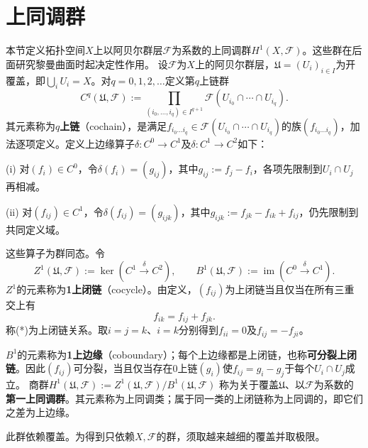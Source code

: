 \section{上同调群}
本节定义拓扑空间$X$上以阿贝尔群层$\mathcal F$为系数的上同调群$H^1(X,\mathcal F)$。这些群在后面研究黎曼曲面时起决定性作用。
设$\mathcal F$为$X$上的阿贝尔群层，$\mathfrak U=(U_i)_{i\in I}$为开覆盖，即$\bigcup_iU_i=X$。对$q=0,1,2,\ldots$定义第$q$上链群
\[
C^q(\mathfrak U,\mathcal F):=\prod_{(i_0,\ldots,i_q)\in I^{q+1}}\mathcal F(U_{i_0}\cap\cdots\cap U_{i_q}).
\]
其元素称为\textbf{$q$上链}（cochain），是满足$f_{i_0\ldots i_q}\in\mathcal F(U_{i_0}\cap\cdots\cap U_{i_q})$的族$(f_{i_0\ldots i_q})$，加法逐项定义。定义上边缘算子$\delta:C^0\to C^1$及$\delta:C^1\to C^2$如下：

(i) 对$(f_i)\in C^0$，令$\delta(f_i)=(g_{ij})$，其中$g_{ij}:=f_j-f_i$，各项先限制到$U_i\cap U_j$再相减。

(ii) 对$(f_{ij})\in C^1$，令$\delta(f_{ij})=(g_{ijk})$，其中$g_{ijk}:=f_{jk}-f_{ik}+f_{ij}$，仍先限制到共同定义域。

这些算子为群同态。令
\[
Z^1(\mathfrak U,\mathcal F):=\ker(C^1\xrightarrow\delta C^2),\qquad
B^1(\mathfrak U,\mathcal F):=\operatorname{im}(C^0\xrightarrow\delta C^1).
\]
$Z^1$的元素称为\textbf{1上闭链}（cocycle）。由定义，$(f_{ij})$为上闭链当且仅当在所有三重交上有
\begin{equation}f_{ik}=f_{ij}+f_{jk}.\tag{*}\end{equation}
称(*)为上闭链关系。取$i=j=k$、$i=k$分别得到$f_{ii}=0$及$f_{ij}=-f_{ji}$。

$B^1$的元素称为\textbf{1上边缘}（coboundary）；每个上边缘都是上闭链，也称\textbf{可分裂上闭链}。因此$(f_{ij})$可分裂，当且仅当存在0上链$(g_i)$使$f_{ij}=g_i-g_j$于每个$U_i\cap U_j$成立。
商群$H^1(\mathfrak U,\mathcal F):=Z^1(\mathfrak U,\mathcal F)/B^1(\mathfrak U,\mathcal F)$
称为关于覆盖$\mathfrak U$、以$\mathcal F$为系数的\textbf{第一上同调群}。其元素称为上同调类；属于同一类的上闭链称为上同调的，即它们之差为上边缘。

此群依赖覆盖。为得到只依赖$X,\mathcal F$的群，须取越来越细的覆盖并取极限。

